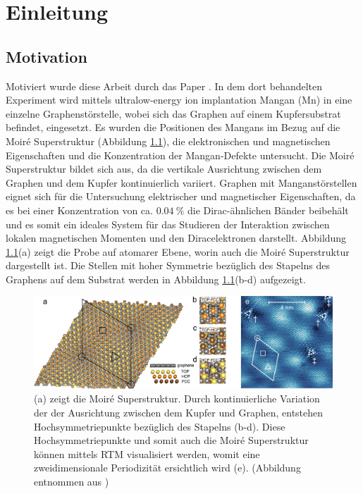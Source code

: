 \chapter{Einleitung}
\section{Motivation}
Motiviert wurde diese Arbeit durch das Paper \cite{doi:10.1021/acsnano.1c00139}.
In dem dort behandelten Experiment wird mittels ultralow-energy ion implantation Mangan (Mn) in eine einzelne Graphenstörstelle, wobei sich das Graphen auf einem Kupfersubstrat befindet, eingesetzt.
Es wurden die Positionen des Mangans im Bezug auf die Moiré Superstruktur (Abbildung \ref{fig:ascnano_structure}), die elektronischen und magnetischen Eigenschaften und die Konzentration der Mangan-Defekte
untersucht.
Die Moiré Superstruktur bildet sich aus, da die vertikale Ausrichtung zwischen dem Graphen und dem Kupfer kontinuierlich variiert.
Graphen mit Manganstörstellen eignet sich für die Untersuchung elektrischer und magnetischer Eigenschaften, da es bei einer Konzentration von ca. $\qty{0.04}{\percent}$ 
die Dirac-ähnlichen Bänder beibehält und es somit ein ideales System für das Studieren der Interaktion
zwischen lokalen magnetischen Momenten und den Diracelektronen darstellt.
Abbildung \ref{fig:ascnano_structure}(a) zeigt die Probe auf atomarer Ebene, worin auch die Moiré Superstruktur dargestellt ist.
Die Stellen mit hoher Symmetrie bezüglich des Stapelns des Graphens auf dem Substrat werden in 
Abbildung \ref{fig:ascnano_structure}(b-d) aufgezeigt.
\begin{figure}
    \centering
    \includegraphics[width = \textwidth]{Plots/images_large_nn1c00139_0002.jpeg}
    \caption{(a) zeigt die Moiré Superstruktur. Durch kontinuierliche Variation der der Ausrichtung 
    zwischen dem Kupfer und Graphen, entstehen Hochsymmetriepunkte bezüglich des Stapelns (b-d).
    Diese Hochsymmetriepunkte und somit auch die Moiré Superstruktur können mittels RTM 
    visualisiert werden, womit eine zweidimensionale Periodizität ersichtlich wird (e).
    (Abbildung entnommen aus \cite{doi:10.1021/acsnano.1c00139})}
    \label{fig:ascnano_structure}
\end{figure}
